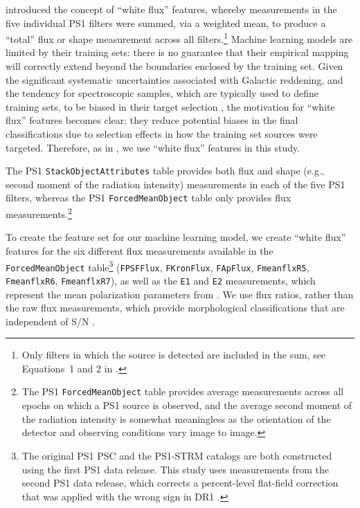 \documentclass[twocolumn]{aastex63}
\begin{document}
\citet{Tachibana18} introduced the concept of ``white flux'' features, whereby
measurements in the five individual PS1 filters were summed, via a weighted
mean, to produce a ``total'' flux or shape measurement across all
filters.\footnote{Only filters in which the source is detected are included in
the sum, see Equations~1 and 2 in \citet{Tachibana18}.} Machine learning
models are limited by their training sets: there is no guarantee that their
empirical mapping will correctly extend beyond the boundaries enclosed by the
training set. Given the significant systematic uncertainties associated with
Galactic reddening, and the tendency for spectroscopic samples, which are
typically used to define training sets, to be biased in their target selection
\citep[see e.g.,][]{Miller17}, the motivation for ``white flux'' features
becomes clear: they reduce potential biases in the final classifications due
to selection effects in how the training set sources were targeted. Therefore,
as in \citet{Tachibana18}, we use ``white flux'' features in this study.

The PS1 \texttt{StackObjectAttributes} table provides both flux and shape
(e.g., second moment of the radiation intensity) measurements in each of the
five PS1 filters, whereas the PS1 \texttt{ForcedMeanObject} table only
provides flux measurements.\footnote{The PS1 \texttt{ForcedMeanObject} table
provides average measurements across all epochs on which a PS1 source is
observed, and the average second moment of the radiation intensity is somewhat
meaningless as the orientation of the detector and observing conditions vary
image to image.}

To create the feature set for our machine learning model, we create ``white
flux'' features for the six different flux measurements available in the
\texttt{ForcedMeanObject} table\footnote{The original PS1 PSC and the PS1-STRM
catalogs are both constructed using the first PS1 data release. This study
uses measurements from the second PS1 data release, which corrects a
percent-level flat-field correction that was applied with the wrong sign in
DR1 \citep{Beck20}.} (\texttt{FPSFFlux}, \texttt{FKronFlux}, \texttt{FApFlux},
\texttt{FmeanflxR5}, \texttt{FmeanflxR6}, \texttt{FmeanflxR7}), as well as the
\texttt{E1} and \texttt{E2} measurements, which represent the mean
polarization parameters from \citet{Kaiser95}. We use flux ratios, rather than
the raw flux measurements, which provide morphological classifications that
are independent of S/N \citep{Lupton01}.
\end{document}
